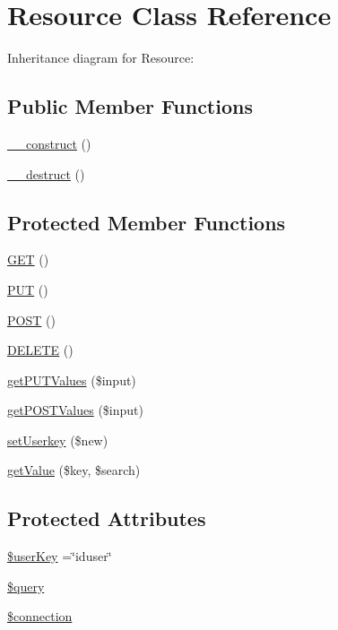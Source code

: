 \hypertarget{class_resource}{}\section{Resource Class Reference}
\label{class_resource}


Inheritance diagram for Resource\+:
\subsection*{Public Member Functions}
\begin{DoxyCompactItemize}
\item 
\mbox{\hyperlink{class_resource_a095c5d389db211932136b53f25f39685}{\+\_\+\+\_\+construct}} ()
\item 
\mbox{\hyperlink{class_resource_a421831a265621325e1fdd19aace0c758}{\+\_\+\+\_\+destruct}} ()
\end{DoxyCompactItemize}
\subsection*{Protected Member Functions}
\begin{DoxyCompactItemize}
\item 
\mbox{\hyperlink{class_resource_a6155e84d5ffcbc4ae944e98f59d49935}{G\+ET}} ()
\item 
\mbox{\hyperlink{class_resource_a2a21af1d6aaaa31249485c753b86eba1}{P\+UT}} ()
\item 
\mbox{\hyperlink{class_resource_a2a7e865a6254f6af7005197d30ad1cc0}{P\+O\+ST}} ()
\item 
\mbox{\hyperlink{class_resource_ab31369bc9c8f31518ed38c1949beb791}{D\+E\+L\+E\+TE}} ()
\item 
\mbox{\hyperlink{class_resource_a6fa5ac14a003a305ce0c3aaa5612dc49}{get\+P\+U\+T\+Values}} (\$input)
\item 
\mbox{\hyperlink{class_resource_abe4378dfc123f2572b60965349062654}{get\+P\+O\+S\+T\+Values}} (\$input)
\item 
\mbox{\hyperlink{class_resource_a02cc9f00efbda79bb7617fce8bcd1ef4}{set\+Userkey}} (\$new)
\item 
\mbox{\hyperlink{class_resource_ab1207918a97f72110966d1bbb95ffec0}{get\+Value}} (\$key, \$search)
\end{DoxyCompactItemize}
\subsection*{Protected Attributes}
\begin{DoxyCompactItemize}
\item 
\mbox{\hyperlink{class_resource_ab1e57a75259c0dc7fd585eddb5066828}{\$user\+Key}} =\char`\"{}iduser\char`\"{}
\item 
\mbox{\hyperlink{class_resource_af59a5f7cd609e592c41dc3643efd3c98}{\$query}}
\item 
\mbox{\hyperlink{class_resource_a0d9c79b9b86b3f5891c6d3892f12c6a0}{\$connection}}
\end{DoxyCompactItemize}


